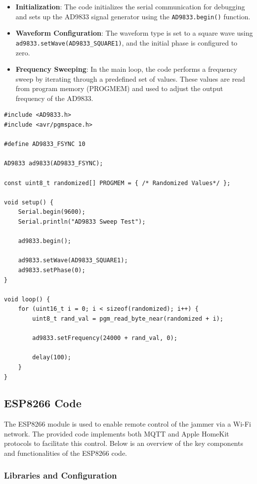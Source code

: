 \begin{itemize}
    \item \textbf{Initialization}: The code initializes the serial communication for debugging and sets up the AD9833 signal generator using the \texttt{AD9833.begin()} function.
    \item \textbf{Waveform Configuration}: The waveform type is set to a square wave using \texttt{ad9833.setWave(AD9833\_SQUARE1)}, and the initial phase is configured to zero.
    \item \textbf{Frequency Sweeping}: In the main loop, the code performs a frequency sweep by iterating through a predefined set of values. These values are read from program memory (PROGMEM) and used to adjust the output frequency of the AD9833.
\end{itemize}

\begin{verbatim}
#include <AD9833.h>
#include <avr/pgmspace.h>

#define AD9833_FSYNC 10 

AD9833 ad9833(AD9833_FSYNC);

const uint8_t randomized[] PROGMEM = { /* Randomized Values*/ };

void setup() {
    Serial.begin(9600);
    Serial.println("AD9833 Sweep Test");

    ad9833.begin();

    ad9833.setWave(AD9833_SQUARE1); 
    ad9833.setPhase(0);                      
}

void loop() {
    for (uint16_t i = 0; i < sizeof(randomized); i++) {
        uint8_t rand_val = pgm_read_byte_near(randomized + i);
        
        ad9833.setFrequency(24000 + rand_val, 0);

        delay(100);
    }
}
\end{verbatim}


\subsection{ESP8266 Code}

The ESP8266 module is used to enable remote control of the jammer via a Wi-Fi network. The provided code implements both MQTT and Apple HomeKit protocols to facilitate this control. Below is an overview of the key components and functionalities of the ESP8266 code.

\subsubsection{Libraries and Configuration}

